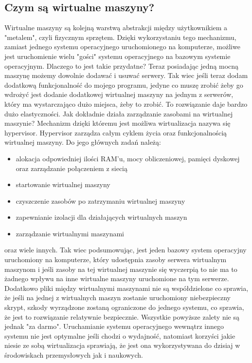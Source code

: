 \subsection{Czym są wirtualne maszyny?}
Wirtualne maszyny są kolejną warstwą abstrakcji między użytkownikiem a "metalem", czyli fizycznym sprzętem. Dzięki wykorzystaniu tego mechanizmu, zamiast jednego systemu operacyjnego uruchomionego na komputerze, możliwe jest uruchomienie wielu "gości" systemu operacyjnego na bazowym systemie operacyjnym. Dlaczego to jest takie przydatne? Teraz posiadając jedną mocną maszynę możemy dowolnie dodawać i usuwać serwery. Tak wiec jeśli  teraz dodam dodatkową funkcjonalność do mojego programu, jedyne co muszę zrobić żeby go wdrożyć jest dodanie dodatkowej wirtualnej maszyny na jednym z serwerów, który ma wystarczająco dużo miejsca, żeby to zrobić. To rozwiązanie daje bardzo dużo elastyczności. 
Jak dokładnie działa zarządzanie zasobami na wirtualnej maszynie?
Mechanizm dzięki któremu jest możliwa wirtualizacja nazywa się hypervisor. Hypervisor zarządza całym cyklem życia oraz funkcjonalnością wirtualnej maszyny. 
Do jego głównych zadań należą:
\begin{itemize}
    \item alokacja odpowiedniej ilości RAM'u, mocy obliczeniowej, pamięci dyskowej oraz zarządzanie połączeniem z siecią
    \item startowanie wirtualnej maszyny 
    \item czyszczenie zasobów po zatrzymaniu wirtualnej maszyny
    \item zapewnianie izolacji dla działających wirtualnych maszyn
    \item zarządzanie wirtualnymi maszynami
\end{itemize}
oraz wiele innych. 
Tak wiec podsumowując, jest jeden bazowy system operacyjny uruchomiony na komputerze, który udostępnia zasoby serwera wirtualnym maszynom i jeśli zasoby na tej wirtualnej maszynie się wyczerpią to nie ma to żadnego wpływu na inne wirtualne maszyny uruchomione na tym serwerze. Dodatkowo pliki między wirtualnymi maszynami nie są współdzielone co sprawia, że jeśli na jednej z wirtualnych maszyn zostanie uruchomiony niebezpieczny skrypt, szkody wyrządzone zostaną ograniczone do jednego systemu, co sprawia, że jest to rozwiązanie relatywnie bezpiecznie.
Wszystkie powyższe zalety nie są jednak "za darmo". Uruchamianie systemu operacyjnego wewnątrz innego systemu nie jest optymalne jeśli chodzi o wydajność, natomiast korzyści jakie niesie ze sobą wirtualizacja sprawiają, że jest ona wykorzystywana do dzisiaj w środowiskach przemysłowych jak i naukowych. 

